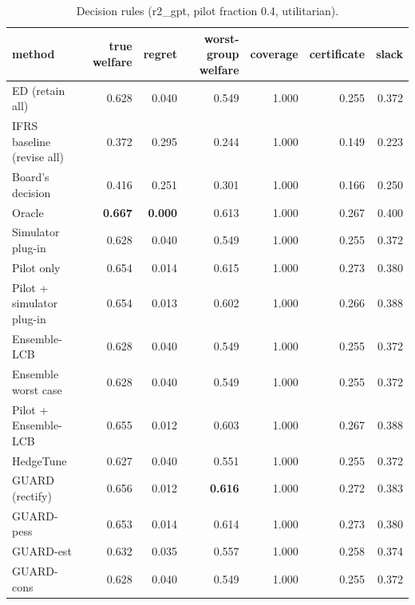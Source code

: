 \begin{table}[t]
\centering
\small
\begin{tabular}{lrrrrrr}
\toprule
method & true welfare & regret & worst-group welfare & coverage & certificate & slack \\
\midrule
ED (retain all) & 0.628 & 0.040 & 0.549 & 1.000 & 0.255 & 0.372 \\
IFRS baseline (revise all) & 0.372 & 0.295 & 0.244 & 1.000 & 0.149 & 0.223 \\
Board's decision & 0.416 & 0.251 & 0.301 & 1.000 & 0.166 & 0.250 \\
Oracle & \textbf{0.667} & \textbf{0.000} & 0.613 & 1.000 & 0.267 & 0.400 \\
Simulator plug-in & 0.628 & 0.040 & 0.549 & 1.000 & 0.255 & 0.372 \\
Pilot only & 0.654 & 0.014 & 0.615 & 1.000 & 0.273 & 0.380 \\
Pilot + simulator plug-in & 0.654 & 0.013 & 0.602 & 1.000 & 0.266 & 0.388 \\
Ensemble-LCB & 0.628 & 0.040 & 0.549 & 1.000 & 0.255 & 0.372 \\
Ensemble worst case & 0.628 & 0.040 & 0.549 & 1.000 & 0.255 & 0.372 \\
Pilot + Ensemble-LCB & 0.655 & 0.012 & 0.603 & 1.000 & 0.267 & 0.388 \\
HedgeTune & 0.627 & 0.040 & 0.551 & 1.000 & 0.255 & 0.372 \\
GUARD (rectify) & 0.656 & 0.012 & \textbf{0.616} & 1.000 & 0.272 & 0.383 \\
GUARD-pess & 0.653 & 0.014 & 0.614 & 1.000 & 0.273 & 0.380 \\
GUARD-est & 0.632 & 0.035 & 0.557 & 1.000 & 0.258 & 0.374 \\
GUARD-cons & 0.628 & 0.040 & 0.549 & 1.000 & 0.255 & 0.372 \\
\bottomrule
\end{tabular}
\caption{Decision rules (r2\_gpt, pilot fraction 0.4, utilitarian).}
\label{tab:methods-utilitarian}
\end{table}
